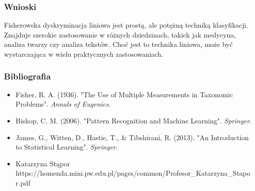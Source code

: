 \documentclass{beamer}
\begin{document}
\begin{frame}
    \frametitle{Wnioski}
    Fisherowska dyskryminacja liniowa jest prostą, ale potężną techniką klasyfikacji. Znajduje szerokie zastosowanie w różnych dziedzinach, takich jak medycyna, analiza twarzy czy analiza tekstów. Choć jest to technika liniowa, może być wystarczająca w wielu praktycznych zastosowaniach.
\end{frame}

\begin{frame}
    \frametitle{Bibliografia}
    \begin{itemize}
        \item Fisher, R. A. (1936). "The Use of Multiple Measurements in Taxonomic Problems". \textit{Annals of Eugenics}.
        \item Bishop, C. M. (2006). "Pattern Recognition and Machine Learning". \textit{Springer}.
        \item James, G., Witten, D., Hastie, T., \& Tibshirani, R. (2013). "An Introduction to Statistical Learning". \textit{Springer}.
        \item Katarzyna Stąpor  https://homenda.mini.pw.edu.pl/pages/common/Profesor_Katarzyna_Stapor.pdf
    \end{itemize}
\end{frame}
\end{document}
